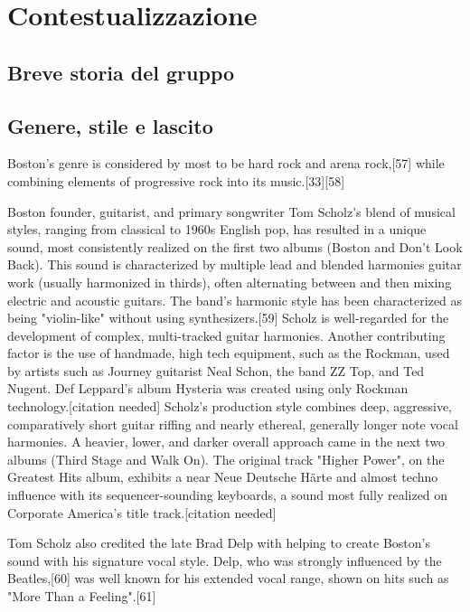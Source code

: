 \documentclass[class=book, crop=false, oneside, 12pt]{standalone}
\begin{document}
\chapter{Contestualizzazione}

\section{Breve storia del gruppo}
\section{Genere, stile e lascito}
Boston's genre is considered by most to be hard rock and arena rock,[57] while combining elements of progressive rock into its music.[33][58]

Boston founder, guitarist, and primary songwriter Tom Scholz's blend of musical styles, ranging from classical to 1960s English pop, has resulted in a unique sound, most consistently realized on the first two albums (Boston and Don't Look Back). This sound is characterized by multiple lead and blended harmonies guitar work (usually harmonized in thirds), often alternating between and then mixing electric and acoustic guitars. The band's harmonic style has been characterized as being "violin-like" without using synthesizers.[59] Scholz is well-regarded for the development of complex, multi-tracked guitar harmonies. Another contributing factor is the use of handmade, high tech equipment, such as the Rockman, used by artists such as Journey guitarist Neal Schon, the band ZZ Top, and Ted Nugent. Def Leppard's album Hysteria was created using only Rockman technology.[citation needed] Scholz's production style combines deep, aggressive, comparatively short guitar riffing and nearly ethereal, generally longer note vocal harmonies. A heavier, lower, and darker overall approach came in the next two albums (Third Stage and Walk On). The original track "Higher Power", on the Greatest Hits album, exhibits a near Neue Deutsche Härte and almost techno influence with its sequencer-sounding keyboards, a sound most fully realized on Corporate America's title track.[citation needed]

Tom Scholz also credited the late Brad Delp with helping to create Boston's sound with his signature vocal style. Delp, who was strongly influenced by the Beatles,[60] was well known for his extended vocal range, shown on hits such as "More Than a Feeling".[61] 
\end{document}
